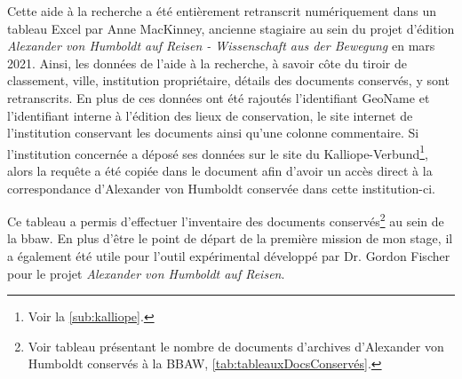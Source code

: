 \documentclass[a4paper, 12pt, twoside]{book}
\begin{document}
Cette aide à la recherche a été entièrement retranscrit numériquement dans un tableau Excel par Anne MacKinney, ancienne stagiaire au sein du projet d'édition \textit{Alexander von Humboldt auf Reisen - Wissenschaft aus der Bewegung} en mars 2021. Ainsi, les données de l'aide à la recherche, à savoir côte du tiroir de classement, ville, institution propriétaire, détails des documents conservés, y sont retranscrits. En plus de ces données ont été rajoutés l'identifiant GeoName et l'identifiant interne à l'édition des lieux de conservation, le site internet de l'institution conservant les documents ainsi qu'une colonne commentaire. Si l'institution concernée a déposé ses données sur le site du Kalliope-Verbund\footnote{Voir la \autoref{sub:kalliope}.}, alors la requête a été copiée dans le document afin d'avoir un accès direct à la correspondance d'Alexander von Humboldt conservée dans cette institution-ci. 

Ce tableau a permis d'effectuer l'inventaire des documents conservés\footnote{Voir tableau présentant le nombre de documents d'archives d'Alexander von Humboldt conservés à la BBAW, \autoref{tab:tableauxDocsConservés}.} au sein de la \gls{bbaw}. En plus d'être le point de départ de la première mission de mon stage, il a également été utile pour l'outil expérimental développé par Dr. Gordon Fischer pour le projet \textit{Alexander von Humboldt auf Reisen}.
\end{document}
